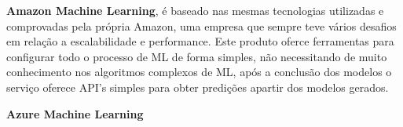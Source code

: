 \begin{alineas}
	\item \textbf{Amazon Machine Learning}, é baseado nas mesmas tecnologias utilizadas e comprovadas pela própria Amazon, uma empresa que sempre teve vários
	desafios em relação a escalabilidade e performance. Este produto oferce ferramentas para configurar todo o processo de ML de forma simples, não necessitando 
	de muito conhecimento nos algoritmos complexos de ML, após a conclusão dos modelos o serviço oferece API's simples para obter predições apartir dos modelos gerados.     
	\item \textbf{Azure Machine Learning}
	
\end{alineas}







